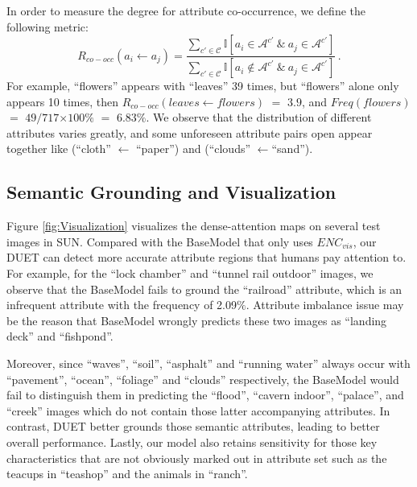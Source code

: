 \documentclass[letterpaper]{article} \usepackage{aaai23}  \usepackage{times}  \usepackage{helvet}  \usepackage{courier}  \usepackage[hyphens]{url}  \usepackage{graphicx} \urlstyle{rm} \def\UrlFont{\rm}  \usepackage{natbib}  \usepackage{caption} \frenchspacing  \setlength{\pdfpagewidth}{8.5in}  \setlength{\pdfpageheight}{11in}  \usepackage{algorithm}
\begin{document}
In order to measure the degree for attribute co-occurrence, 
we define {the following metric:}
\begin{equation}
    R_{co-occ}(a_i \gets a_j) = \frac
    {\sum_{{c}\prime \in \mathcal{C}} \mathbb{I}{\left[a_i \in \mathcal{A}^{{c}\prime} ~\&~  a_j \in \mathcal{A}^{{c}\prime} \right]}}
    {\sum_{{c}\prime \in \mathcal{C}} \mathbb{I}{\left[a_i \notin \mathcal{A}^{{c}\prime} ~\&~  a_j \in \mathcal{A}^{{c}\prime} \right]}}\,.
\end{equation}
For example, ``flowers'' appears with ``leaves'' 39 times, but ``flowers'' alone only appears 10 times, then $R_{co-occ}({leaves} \gets {flowers})$ $=$ $3.9$, and $Freq({flowers})$ $=$ $49$$/$$717$$\times$$100\%$ $=$ $6.83\%$.
We observe that the distribution of different attributes varies greatly, and some unforeseen attribute pairs open appear together like (``cloth'' $\gets$ ``paper'') and (``clouds'' $\gets$``sand'').

\subsection{Semantic Grounding and Visualization}

Figure \ref{fig:Visualization} visualizes the dense-attention maps on several test images {in SUN.}
Compared with the BaseModel that only use{s} $ENC_{vis}$, our DUET can detect more accurate attribute regions that humans pay 
attention to.
{For example,}
for the ``lock chamber'' and ``tunnel rail outdoor'' images, we observe that the BaseModel fail{s} to ground the ``railroad'' attribute, 
which is an infrequent attribute {with the frequency of 2.09$\%$.}
Attribute imbalance issue may be the reason {that} BaseModel {wrongly predicts} these {two images} as ``landing deck'' and ``fishpond''.

Moreover, 
since ``waves'',  ``soil'',  ``asphalt'' and ``running water''
always occur with ``pavement'', ``ocean'', ``foliage'' and ``clouds'' respectively, 
the BaseModel {would fail to distinguish them in predicting} 
the ``flood'', ``cavern indoor'', ``palace'', and ``creek'' images which {do not} contain those latter accompanying attributes.
{In contrast, DUET better  grounds those semantic attributes, leading to better overall performance.}
Lastly, our model also retains sensitivity for those key characteristics that are not obviously marked out in attribute set such as the teacups in ``teashop'' and the animals in ``ranch''.
\end{document}
